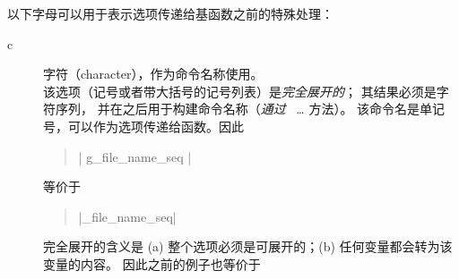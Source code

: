 \documentclass[full]{l3doc}
\begin{document}
%
以下字母可以用于表示选项传递给基函数之前的特殊处理：
\begin{description}
    \item[c] 字符（character），作为命令名称使用。\\
    该选项（记号或者带大括号的记号列表）是\emph{完全展开的}；
    其结果必须是字符序列，
    并在之后用于构建命令名称（\emph{通过}~ \ldots {} 方法）。
    该命令名是单记号，可以作为选项传递给函数。因此
    \begin{quote}
         |{ g_file_name_seq }| 
    \end{quote}
    等价于
    \begin{quote}
         |\g_file_name_seq| 
    \end{quote}
    完全展开的含义是 (a) 整个选项必须是可展开的；(b) 任何变量都会转为该变量的内容。
    因此之前的例子也等价于

\end{description}
\end{document}
